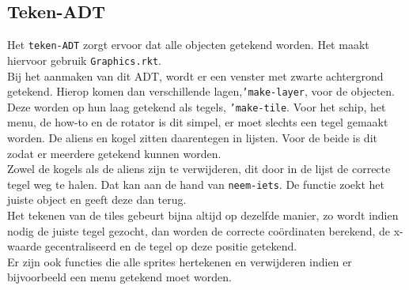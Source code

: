 \documentclass[]{article}
\begin{document}
\subsection{Teken-ADT}
Het \texttt{teken-ADT} zorgt ervoor dat alle objecten getekend worden. Het maakt hiervoor gebruik \texttt{Graphics.rkt}. \\
Bij het aanmaken van dit ADT, wordt er een venster met zwarte achtergrond getekend. Hierop komen dan verschillende lagen,\texttt{'make-layer}, voor de objecten. Deze worden op hun laag getekend als tegels, \texttt{'make-tile}. Voor het schip, het menu, de how-to en de rotator is dit simpel, er moet slechts een tegel gemaakt worden. De aliens en kogel zitten daarentegen in lijsten. Voor de beide is dit zodat er meerdere getekend kunnen worden.  \\
Zowel de kogels als de aliens zijn te verwijderen, dit door in de lijst de correcte tegel weg te halen. Dat kan aan de hand van \texttt{neem-iets}. De functie zoekt het juiste object en geeft deze dan terug. \\
Het tekenen van de tiles gebeurt bijna altijd op dezelfde manier, zo wordt indien nodig de juiste tegel gezocht, dan worden de correcte co\"{o}rdinaten berekend, de x-waarde gecentraliseerd en de tegel op deze positie getekend. \\
Er zijn ook functies die alle sprites hertekenen en verwijderen indien er bijvoorbeeld een menu getekend moet worden.
\end{document}

